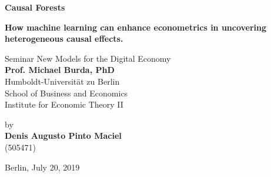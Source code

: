 \begin{center}

    {\Large{\bf Causal Forests}} \vspace{0.5cm}

    {\large{\bf How machine learning can enhance econometrics in uncovering heterogeneous causal effects.}} \vspace{0.5cm}

    {\normalsize Seminar New Models for the Digital Economy\\\vspace{0.5cm}}
    {\normalsize{\bf Prof. Michael Burda, PhD}} \\\vspace{0.5cm}
    {\normalsize Humboldt-Universit\"at zu Berlin \\
    School of Business and Economics \\
    Institute for Economic Theory II} \vspace{1cm}

    {\normalsize by \\\vspace{0.5cm}
    {\bf Denis Augusto Pinto Maciel} \\
    (505471)} \vspace{1cm}


    {\normalsize Berlin, July 20, 2019}

\end{center}
